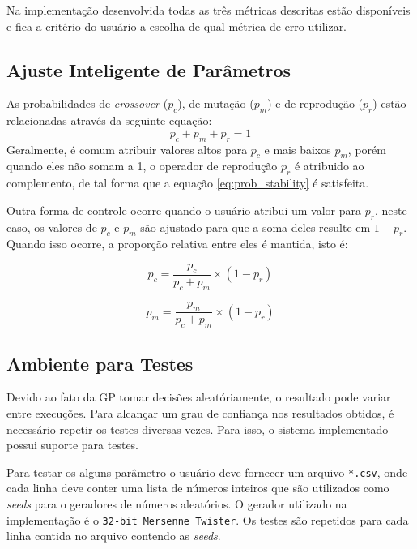 \documentclass[a4paper]{paper}
\begin{document}
Na implementação desenvolvida todas as três métricas descritas estão disponíveis
e fica a critério do usuário a escolha de qual métrica de erro utilizar.

\subsection{Ajuste Inteligente de Parâmetros}\label{subsec:smart_par}

As probabilidades de \textit{crossover} ($p_c$), de mutação ($p_m$) e de
reprodução ($p_r$) estão relacionadas através da seguinte equação:
\begin{equation} \label{eq:prob_stability}
  p_c + p_m + p_r = 1
\end{equation}
Geralmente, é comum atribuir valores altos para $p_c$ e mais baixos $p_m$, porém
quando eles não somam a 1, o operador de reprodução $p_r$ é atribuido ao
complemento, de tal forma que a equação \ref{eq:prob_stability} é satisfeita.

Outra forma de controle ocorre quando o usuário atribui um valor para $p_r$,
neste caso, os valores de $p_c$ e $p_m$ são ajustado para que a soma deles
resulte em $1-p_r$. Quando isso ocorre, a proporção relativa entre eles é
mantida, isto é:

\noindent\begin{minipage}{.5\linewidth}
  \begin{equation*}
    p_c = \frac{p_c}{p_c+p_m}\times (1-p_r)  
  \end{equation*}
\end{minipage}
\begin{minipage}{.5\linewidth}
  \begin{equation*}
    p_m = \frac{p_m}{p_c+p_m}\times (1-p_r)  
  \end{equation*}
\end{minipage}

\subsection{Ambiente para Testes}

Devido ao fato da GP tomar decisões aleatóriamente, o resultado pode variar
entre execuções. Para alcançar um grau de confiança nos resultados obtidos, é
necessário repetir os testes diversas vezes. Para isso, o sistema implementado
possui suporte para testes.

Para testar os alguns parâmetro o usuário deve fornecer um arquivo
\texttt{*.csv}, onde cada linha deve conter uma lista de números inteiros que
são utilizados como \textit{seeds} para o geradores de números aleatórios. O
gerador utilizado na implementação é o \texttt{32-bit Mersenne Twister}. Os
testes são repetidos para cada linha contida no arquivo contendo as
\textit{seeds}.
\end{document}

